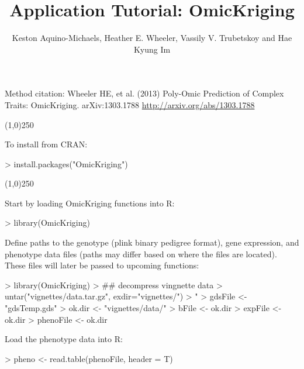 \documentclass[a4paper]{article}
\title{Application Tutorial: OmicKriging}
\author{Keston Aquino-Michaels, Heather E. Wheeler, Vassily V. Trubetskoy and Hae Kyung Im}
\begin{document}

\maketitle
Method citation: Wheeler HE, et al. (2013) Poly-Omic Prediction of Complex Traits: OmicKriging. arXiv:1303.1788 \url{http://arxiv.org/abs/1303.1788}
\begin{center}
\line(1,0){250}
\end{center}
To install from CRAN:
\begin{Schunk}
\begin{Sinput}
> install.packages("OmicKriging")
\end{Sinput}
\end{Schunk}
\begin{center}
\line(1,0){250}
\end{center}
Start by loading OmicKriging functions into R:
\begin{Schunk}
\begin{Sinput}
> library(OmicKriging)
\end{Sinput}
\end{Schunk}
Define paths to the genotype (plink binary pedigree format), gene expression, and phenotype data files (paths may differ based on where the files are located). These files will later be passed to upcoming functions:
\begin{Schunk}

\begin{Schunk}
\begin{Sinput}
> library(OmicKriging)
> ## decompress vingnette data
> untar("vignettes/data.tar.gz", exdir="vignettes/")
> "%&%" <- function(a, b) paste(a, b, sep="")
> gdsFile <- "gdsTemp.gds"
> ok.dir <- "vignettes/data/"
> bFile <- ok.dir %&% "ig_genotypes"
> expFile <- ok.dir %&% "ig_gene_exon.txt"
> phenoFile <- ok.dir %&% "ig_pheno.txt"
\end{Sinput}
\end{Schunk}

\end{Schunk}
Load the phenotype data into R:
\begin{Schunk}

\begin{Schunk}
\begin{Sinput}
> pheno <- read.table(phenoFile, header = T)
\end{Sinput}
\end{Schunk}

\end{Schunk}
\end{document}
